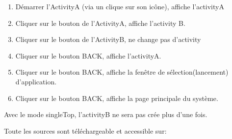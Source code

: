 	\begin{enumerate}
			\item Démarrer l'ActivityA (via un clique sur son icône), affiche l'activityA
			\item Cliquer sur le bouton de l’ActivityA, affiche l'activity B.
			\item  Cliquer sur le bouton de l’ActivityB, ne change pas d'activity
			\item Cliquer sur le bouton BACK, affiche l'activityA.
			\item Cliquer sur le bouton BACK, affiche la fenêtre de sélection(lancement) d'application.
			\item Cliquer sur le bouton BACK, affiche la page principale du système.
	\end{enumerate}
	
	Avec le mode singleTop, l'activityB ne sera pas crée plus d'une fois. 
	
	
	Toute les sources sont téléchargeable et accessible sur: 
